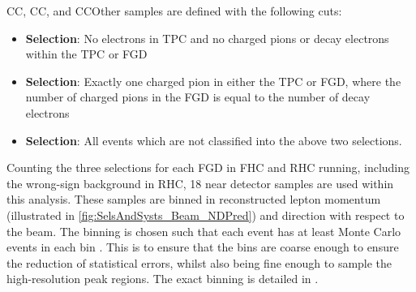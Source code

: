 CC\quickmath{0\pi}, CC\quickmath{1\pi}, and CCOther samples are defined with the following cuts:


\begin{itemize}
\item \textbf{ Selection}: No electrons in TPC and no charged pions or decay electrons within the TPC or FGD
\item \textbf{ Selection}: Exactly one charged pion in either the TPC or FGD, where the number of charged pions in the FGD is equal to the number of decay electrons
\item \textbf{ Selection}: All events which are not classified into the above two selections.
\end{itemize}

Counting the three selections for each FGD in FHC and RHC running, including the wrong-sign background in RHC, 18 near detector samples are used within this analysis. These samples are binned in reconstructed lepton momentum (illustrated in \autoref{fig:SelsAndSysts_Beam_NDPred}) and direction with respect to the beam. The binning is chosen such that each event has at least  Monte Carlo events in each bin \cite{thesis_will}. This is to ensure that the bins are coarse enough to ensure the reduction of statistical errors, whilst also being fine enough to sample the high-resolution peak regions. The exact binning is detailed in \cite{thesis_will}.

